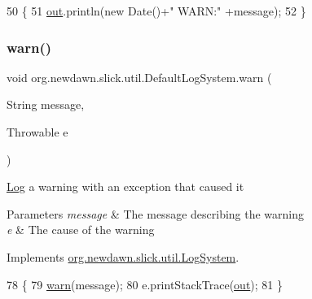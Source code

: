 \begin{DoxyCode}
50                                      \{
51         \mbox{\hyperlink{classorg_1_1newdawn_1_1slick_1_1util_1_1_default_log_system_af8720c665caabb6455863d23de8617da}{out}}.println(\textcolor{keyword}{new} Date()+\textcolor{stringliteral}{" WARN:"} +message);
52     \}
\end{DoxyCode}
\mbox{\label{classorg_1_1newdawn_1_1slick_1_1util_1_1_default_log_system_ab630bdef457c3881ef3d8fdcedf6d8bf}} 
\subsubsection{\texorpdfstring{warn()}{warn()}\hspace{0.1cm}{\footnotesize\ttfamily [2/2]}}
{\footnotesize\ttfamily void org.\+newdawn.\+slick.\+util.\+Default\+Log\+System.\+warn (\begin{DoxyParamCaption}\item[{String}]{message,  }\item[{Throwable}]{e }\end{DoxyParamCaption})\hspace{0.3cm}{\ttfamily [inline]}}

\mbox{\hyperlink{classorg_1_1newdawn_1_1slick_1_1util_1_1_log}{Log}} a warning with an exception that caused it


\begin{DoxyParams}{Parameters}
{\em message} & The message describing the warning \\
\hline
{\em e} & The cause of the warning \\
\hline
\end{DoxyParams}


Implements \mbox{\hyperlink{interfaceorg_1_1newdawn_1_1slick_1_1util_1_1_log_system_a21c1d0fd6928a9973d9727b521bf9352}{org.\+newdawn.\+slick.\+util.\+Log\+System}}.


\begin{DoxyCode}
78                                                   \{
79         \mbox{\hyperlink{classorg_1_1newdawn_1_1slick_1_1util_1_1_default_log_system_a43bae56fa5d877bbdee7a413e3699f63}{warn}}(message);
80         e.printStackTrace(\mbox{\hyperlink{classorg_1_1newdawn_1_1slick_1_1util_1_1_default_log_system_af8720c665caabb6455863d23de8617da}{out}});
81     \}
\end{DoxyCode}



